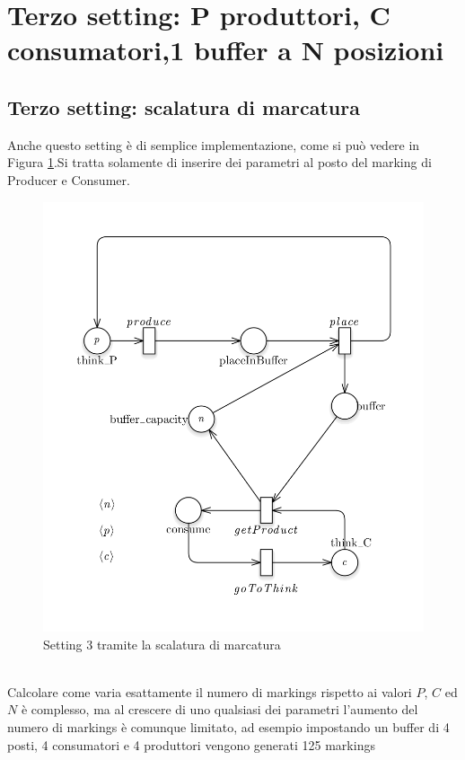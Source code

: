 \documentclass{article}
\begin{document}
\newpage
\section{Terzo  setting: P produttori, C consumatori,1 buffer a N posizioni}\label{SEC:terzo}
\subsection{Terzo  setting: scalatura di marcatura}\label{SEC:terzo-marking}
Anche questo setting è di semplice implementazione, come si può vedere in Figura \ref{FIG:setting3_markdown}.Si tratta solamente di inserire dei parametri al posto del marking di Producer e Consumer.
\begin{figure}[!ht]
\centering
\includegraphics[width=\textwidth]{./Esercizio2_img/setting3_markdown.png}
\caption{Setting 3 tramite la scalatura di marcatura} \label{FIG:setting3_markdown}
\end{figure}\\
Calcolare come varia esattamente il numero di markings rispetto ai valori $P$, $C$ ed $N$ è complesso, ma al crescere di uno qualsiasi dei parametri l'aumento del numero di markings è comunque limitato, ad esempio impostando un buffer di 4 posti, 4 consumatori e 4 produttori vengono generati 125 markings
\end{document}
